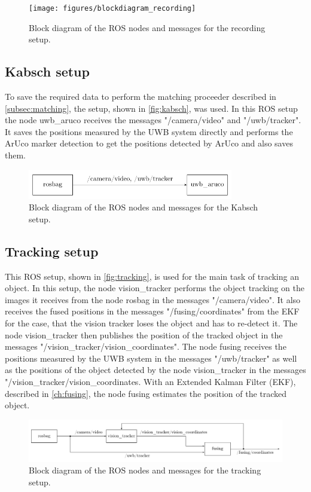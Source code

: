 \begin{figure}[ht!]\centering
	\texttt{[image: figures/blockdiagram\_recording]}
	\caption{Block diagram of the \ac{ROS} nodes and messages for the recording setup.}\label{fig:recording}
\end{figure}

\subsection{Kabsch setup}\label{subsec:kabsch}
To save the required data to perform the matching proceeder described in \autoref{subsec:matching}, the setup, shown in \autoref{fig:kabsch}, was used. In this \ac{ROS} setup the node uwb\_aruco receives the messages "/camera/video" and "/uwb/tracker". It saves the positions measured by the \ac{UWB} system directly and performs the ArUco marker detection to get the positions detected by ArUco and also saves them.

\begin{figure}[ht!]\centering
	\includegraphics[width=0.8\textwidth]{figures/blockdiagram_kabsch}
	\caption{Block diagram of the \ac{ROS} nodes and messages for the Kabsch setup.}\label{fig:kabsch}
\end{figure}

\subsection{Tracking setup}\label{subsec:tracking}
This \ac{ROS} setup, shown in \autoref{fig:tracking}, is used for the main task of tracking an object. In this setup, the node vision\_tracker performs the object tracking on the images it receives from the node rosbag in the messages "/camera/video". It also receives the fused positions in the messages "/fusing/coordinates" from the \ac{EKF} for the case, that the vision tracker loses the object and has to re-detect it. The node vision\_tracker then publishes the position of the tracked object in the messages "/vision\_tracker/vision\_coordinates". The node fusing receives the positions measured by the \ac{UWB} system in the messages "/uwb/tracker" as well as the positions of the object detected by the node vision\_tracker in the messages "/vision\_tracker/vision\_coordinates. With an Extended Kalman Filter (EKF), described in \autoref{ch:fusing}, the node fusing estimates the position of the tracked object.

\begin{figure}[ht!]\centering
	\includegraphics[width=1.0\textwidth]{figures/blockdiagram_tracking}
	\caption{Block diagram of the \ac{ROS} nodes and messages for the tracking setup.}\label{fig:tracking}
\end{figure}
